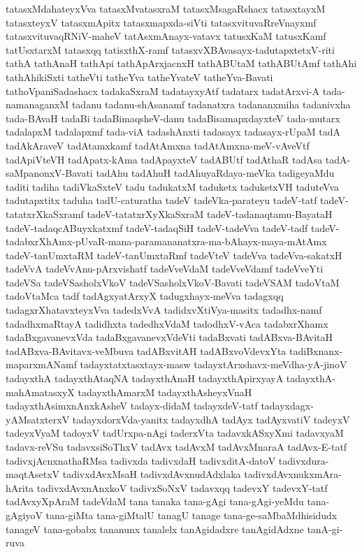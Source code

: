{tatasxMdahateyxVva
tatasxMvatasxraM
tatasxMsagaRshacx
tatasxtayxM
tatasxteyxV
tatasxmApitx
tatasxmapxda-siVti
tatasxvituvaRreVnayxmf
tatasxvituvaqRNiV-maheV
tatAsxmAnayx-vatavx
tatusxKaM
tatusxKamf
tatUsxtarxM
tatasxqq
tatisxthX-ramf
tatasxvXBAvasayx-tadutapxtetxV-riti
tathA
tathAnaH
tathApi
tathApArxjacnxH
tathABUtaM
tathABUtAmf
tathAhi
tathAhikiSxti
tatheVti
tatheYva
tatheYvateV
tatheYva-Bavati
tathoVpaniSadashacx
tadakaSxraM
tadatayxyAtf
tadatarx
tadatArxvi-A
tada-namanaganxM
tadanu
tadanu-shAsanamf
tadanatxra
tadananxmiha
tadanivxha
tada-BAvaH
tadaBi
tadaBimaqsheV-danu
tadaBisamapxdayxteV
tada-mutarx
tadalapxM
tadalapxmf
tada-viA
tadashAnxti
tadasayx
tadasayx-rUpaM
tadA
tadAkAraveV
tadAtamxkamf
tadAtAmxna
tadAtAmxna-meV-vAveVtf
tadApiVteVH
tadApatx-kAma
tadApayxteV
tadABUtf
tadAthaR
tadAsa
tadA-saMpanonxV-Bavati
tadAhu
tadAhuH
tadAhuyaRdaya-meVka
tadigeyaMdu
taditi
tadiha
tadiVkaSxteV
tadu
tadukatxM
taduketx
taduketxVH
taduteVva
tadutapxtitx
taduha
tadU-caturatha
tadeV
tadeVka-parateyu
tadeV-tatf
tadeV-tatatxrXkaSxramf
tadeV-tatatxrXyXkaSxraM
tadeV-tadanaqtamu-BayataH
tadeV-tadaqcABuyxkatxmf
tadeV-tadaqSiH
tadeV-tadeVva
tadeV-tadf
tadeV-tadabxrXhAmx-pUvaR-mana-paramananatxra-ma-bAhayx-maya-mAtAmx
tadeV-tanUmxtaRM
tadeV-tanUmxtaRmf
tadeVteV
tadeVva
tadeVva-sakatxH
tadeVvA
tadeVvAnu-pArxvishatf
tadeVveVdaM
tadeVveVdamf
tadeVveYti
tadeVSa
tadeVSasholxVkoV
tadeVSasholxVkoV-Bavati
tadeVSAM
tadoVtaM
tadoVtaMca
tadf
tadAgxyatArxyX
tadugxhayx-meVva
tadagxqq
tadagxrXhatavxteyxVva
tadedxVvA
tadidxvXtiVya-masitx
tadadhx-namf
tadadhxmaRtayA
tadidhxta
tadedhxVdaM
tadodhxV-vAca
tadabxrXhamx
tadaBxgavanevxVda
tadaBxgavanevxVdeVti
tadaBxvati
tadABxva-BAvitaH
tadABxva-BAvitavx-veMbuva
tadABxvitAH
tadABxvoVdevxYta
tadiBxnanx-maparxmANamf
tadayxtatxtasxtayx-masw
tadayxtArxshavx-meVdha-yA-jinoV
tadayxthA
tadayxthAtaqNA
tadayxthAnaH
tadayxthApirxyayA
tadayxthA-mahAmatasxyX
tadayxthAmarxM
tadayxthAsheyxVnaH
tadayxthAsimxnAnxkAsheV
tadayx-didaM
tadayxdeV-tatf
tadayxdagx-yAMsatxterxV
tadayxdorxVda-yanitx
tadayxdhA
tadAyx
tadAyxvatiV
tadeyxV
tadeyxVyaM
tadoyxV
tadUrxpa-nAgi
taderxVta
tadavxkASxyXmi
tadavxyaM
tadavx-reVSu
tadavxsiSoThxV
tadAvx
tadAvxM
tadAvxMnaraA
tadAvx-E-tatf
tadivxjAcnxnathaRMsa
tadivxda
tadivxdaH
tadivxditA-datoV
tadivxdura-maqtAsetxV
tadivxdAvxMsaH
tadivxdAvxnudAdxlaka
tadivxdAvxnukxmAra-hArita
tadivxdAvxnAnxkoV
tadivxSoNxV
tadavxqq
tadevxY
tadevxY-tatf
tadAvxyXpAraM
tadeVdaM
tana
tanaka
tana-gAgi
tana-gAgi-yeMdu
tana-gAgiyoV
tana-giMta
tana-giMtalU
tanagU
tanage
tana-ge-saMbaMdhisidudx
tanageV
tana-gobabx
tananunx
tanalelx
tanAgidadxre
tanAgidAdxne
tanA-gi-ruva
}
